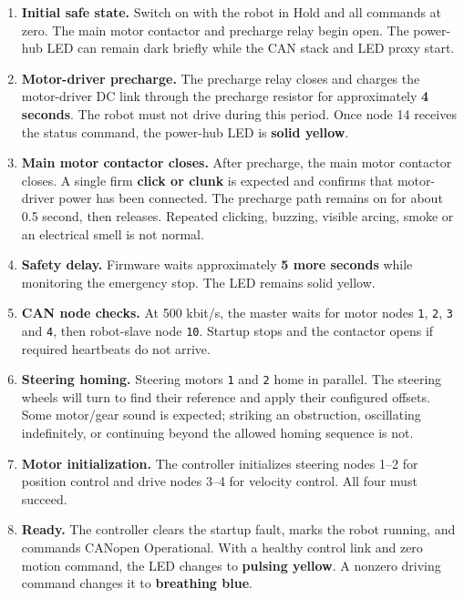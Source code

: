\documentclass[
  10pt,
  letterpaper,
  openany]{report}
\providecommand{\tightlist}{%
  \setlength{\itemsep}{0pt}\setlength{\parskip}{0pt}}
\begin{document}
\begin{enumerate}
\tightlist
\item
  \textbf{Initial safe state.} Switch on with the robot in Hold and all
  commands at zero. The main motor contactor and precharge relay begin
  open. The power-hub LED can remain dark briefly while the CAN stack
  and LED proxy start.
\item
  \textbf{Motor-driver precharge.} The precharge relay closes and
  charges the motor-driver DC link through the precharge resistor for
  approximately \textbf{4 seconds}. The robot must not drive during this
  period. Once node 14 receives the status command, the power-hub LED is
  \textbf{solid yellow}.
\item
  \textbf{Main motor contactor closes.} After precharge, the main motor
  contactor closes. A single firm \textbf{click or clunk} is expected
  and confirms that motor-driver power has been connected. The precharge
  path remains on for about 0.5 second, then releases. Repeated
  clicking, buzzing, visible arcing, smoke or an electrical smell is not
  normal.
\item
  \textbf{Safety delay.} Firmware waits approximately \textbf{5 more
  seconds} while monitoring the emergency stop. The LED remains solid
  yellow.
\item
  \textbf{CAN node checks.} At 500 kbit/s, the master waits for motor
  nodes \texttt{1}, \texttt{2}, \texttt{3} and \texttt{4}, then
  robot-slave node \texttt{10}. Startup stops and the contactor opens if
  required heartbeats do not arrive.
\item
  \textbf{Steering homing.} Steering motors \texttt{1} and \texttt{2}
  home in parallel. The steering wheels will turn to find their
  reference and apply their configured offsets. Some motor/gear sound is
  expected; striking an obstruction, oscillating indefinitely, or
  continuing beyond the allowed homing sequence is not.
\item
  \textbf{Motor initialization.} The controller initializes steering
  nodes 1--2 for position control and drive nodes 3--4 for velocity
  control. All four must succeed.
\item
  \textbf{Ready.} The controller clears the startup fault, marks the
  robot running, and commands CANopen Operational. With a healthy
  control link and zero motion command, the LED changes to
  \textbf{pulsing yellow}. A nonzero driving command changes it to
  \textbf{breathing blue}.
\end{enumerate}
\end{document}

